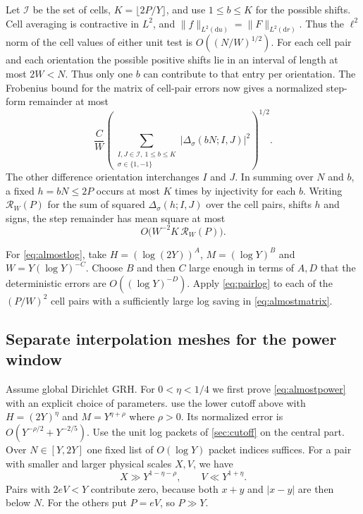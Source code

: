 \documentclass[11pt,a4paper]{article}
\numberwithin{equation}{section}
\newcommand{\ud}{\mathrm d}
\begin{document}
Let $\mathcal I$ be the set of cells, $K=\lfloor2P/Y\rfloor$,
and use $1\le b\le K$ for the possible shifts. Cell averaging
is contractive in $L^2$, and $\|f\|_{L^2(\ud u)}=\|F\|_{L^2(\ud r)}$.
Thus the $\ell^2$ norm of the cell values of either unit test is
$O((N/W)^{1/2})$. For each cell pair and each orientation the
possible positive shifts lie in an interval of length at most
$2W<N$. Thus only one $b$ can contribute to that entry per
orientation. The Frobenius bound for the matrix of cell-pair
errors now gives a normalized step-form remainder at most
\[
 \frac{C}{W}\left(\sum_{\substack{I,J\in\mathcal I,\ 1\le b\le K\\
                                  \sigma\in\{1,-1\}}}
                |\Delta_\sigma(bN;I,J)|^2\right)^{1/2}.
\]
The other difference orientation interchanges $I$ and $J$.
In summing over $N$ and $b$, a fixed $h=bN\le2P$ occurs
at most $K$ times by injectivity for each $b$.
Writing $\mathcal R_W(P)$ for the sum of squared
$\Delta_\sigma(h;I,J)$ over the cell pairs, shifts $h$ and signs,
the step remainder has mean square at most
\begin{equation}
 O\bigl(W^{-2}K\,\mathcal R_W(P)\bigr).
 \label{eq:almostmatrix}
\end{equation}

For \cref{eq:almostlog}, take $H=(\log(2Y))^A$,
$M=(\log Y)^B$ and $W=Y(\log Y)^{-C}$. Choose $B$ and then $C$
large enough in terms of $A,D$ that the deterministic errors
are $O((\log Y)^{-D})$. Apply \cref{eq:pairlog} to each of the
$(P/W)^2$ cell pairs with a sufficiently large log saving
in \cref{eq:almostmatrix}.

\subsection{Separate interpolation meshes for the power window}

Assume global Dirichlet GRH. For $0<\eta<1/4$ we first prove
\cref{eq:almostpower} with an explicit choice of parameters.
use the lower cutoff above with $H=(2Y)^\eta$ and
$M=Y^{\eta+\rho}$ where $\rho>0$. Its normalized error is
$O(Y^{-\rho/2}+Y^{-2/5})$. Use the unit log packets of
\cref{sec:cutoff} on the central part. Over $N\in[Y,2Y]$
one fixed list of $O(\log Y)$ packet indices suffices.
For a pair with smaller and larger physical scales $X,V$,
we have
\begin{equation}
 X\gg Y^{1-\eta-\rho},\qquad V\ll Y^{1+\eta}.
 \label{eq:adaptivewindow}
\end{equation}
Pairs with $2eV<Y$ contribute zero, because both $x+y$ and
$|x-y|$ are then below $N$. For the others put $P=eV$,
so $P\gg Y$.
\end{document}
